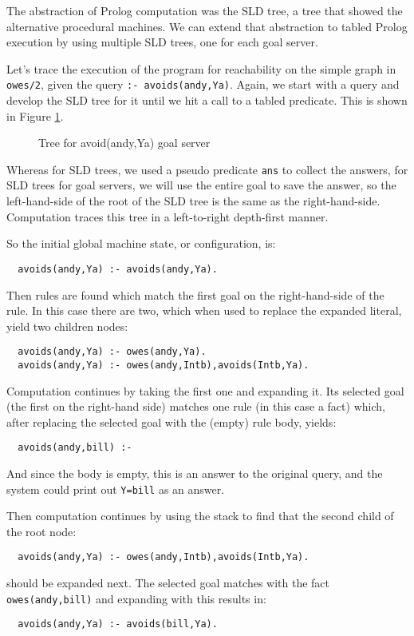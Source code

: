 The abstraction of Prolog computation was the SLD tree, a tree that
showed the alternative procedural machines.  We can extend that
abstraction to tabled Prolog execution by using multiple SLD trees,
one for each goal server.  

Let's trace the execution of the program for reachability on the
simple graph in \verb|owes/2|, given the query 
\verb|:- avoids(andy,Ya)|.  
Again, we start with a query and develop the SLD
tree for it until we hit a call to a tabled predicate.  This is shown
in Figure
\ref{slgf-owe1}.
\begin{figure}
\centerline{}
\caption{Tree for avoid(andy,Ya) goal server}\label{slgf-owe1}
\end{figure}
Whereas for SLD trees, we used a pseudo predicate \verb|ans| to
collect the answers, for SLD trees for goal servers, we will use the
entire goal to save the answer, so the left-hand-side of the root of
the SLD tree is the same as the right-hand-side.  Computation traces
this tree in a left-to-right depth-first manner.  

So the initial global machine state, or configuration, is:
\begin{verbatim}
  avoids(andy,Ya) :- avoids(andy,Ya).
\end{verbatim}

Then rules are found which match the first goal on the right-hand-side
of the rule.  In this case there are two, which when used to replace
the expanded literal, yield two children nodes:
\begin{verbatim}
  avoids(andy,Ya) :- owes(andy,Ya).
  avoids(andy,Ya) :- owes(andy,Intb),avoids(Intb,Ya).
\end{verbatim}

Computation continues by taking the first one and expanding it.  Its
selected goal (the first on the right-hand side) matches one rule (in
this case a fact) which, after replacing the selected goal with the
(empty) rule body, yields:
\begin{verbatim}
  avoids(andy,bill) :-
\end{verbatim}
And since the body is empty, this is an answer to the original query,
and the system could print out \verb|Y=bill| as an answer.

Then computation continues by using the stack to find that the second
child of the root node:
\begin{verbatim}
  avoids(andy,Ya) :- owes(andy,Intb),avoids(Intb,Ya).
\end{verbatim}
should be expanded next.  The selected goal matches with the fact
\verb|owes(andy,bill)| and expanding with this results in:
\begin{verbatim}
  avoids(andy,Ya) :- avoids(bill,Ya).
\end{verbatim}

